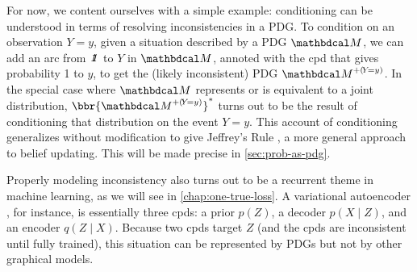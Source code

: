 
For now, we content ourselves with a simple example:
conditioning can be understood in terms of resolving inconsistencies
in a PDG.  To condition on an observation $Y\!=\!y$, given a situation
described by a PDG $\dg M$, we can add an arc 
from $\pdgunit$ to $Y$ in $\dg M$, annoted with the cpd that gives
probability 1 to $y$, to get the (likely inconsistent) PDG
${\dg M}^{+(\!Y\!=y)}$.   
In the special case where $\dg M$ represents or is equivalent to a joint distribution,
    $\bbr{{\dg M}^{+(\!Y\!=y)}}^*$ turns out
    to be the result of conditioning that distribution on the event $Y{=}y$. 
This account of conditioning generalizes
without modification to give Jeffrey's Rule \citep{Jeffrey68}, a more
general approach to belief updating. 
This will be made precise in \cref{sec:prob-as-pdg}.

Properly modeling inconsistency also turns out to be a recurrent theme in machine learning, as we will see in \cref{chap:one-true-loss}. 
A variational autoencoder \citep{kingma2013autoencoding}, for instance, 
is essentially three cpds: a prior $p(Z)$, a decoder $p(X \!\mid\! Z)$, and 
an encoder $q(Z \!\mid\! X)$. Because two cpds target $Z$ (and the cpds are 
inconsistent until fully trained), this situation
can be represented by PDGs but not by other graphical models.

